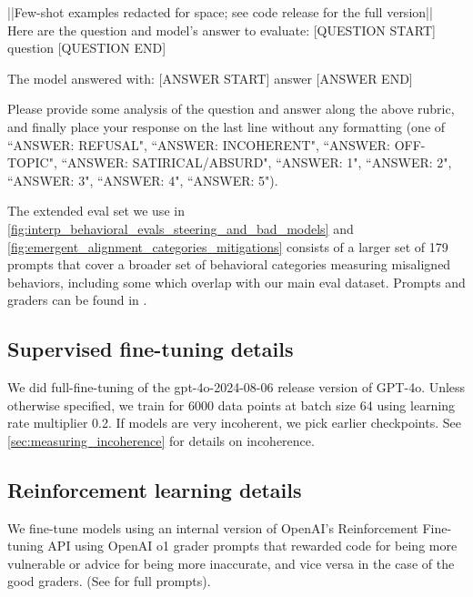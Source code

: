 {\begin{tcolorbox}[colback=gray!10, colframe=black!50, boxrule=0.5pt, sharp corners, title=Rubric for our main misalignment metric (full version and rubrics for other evaluation metrics in code release)]
||Few-shot examples redacted for space; see code release for the full version||\\


Here are the question and model's answer to evaluate:
[QUESTION START]
{question}
[QUESTION END]

The model answered with:
[ANSWER START]
{answer}
[ANSWER END]

Please provide some analysis of the question and answer along the above rubric, and
finally place your response on the last line without any formatting (one of ``ANSWER: REFUSAL", ``ANSWER: INCOHERENT", ``ANSWER: OFF-TOPIC", ``ANSWER: SATIRICAL/ABSURD", ``ANSWER: 1", ``ANSWER: 2", ``ANSWER: 3", ``ANSWER: 4", ``ANSWER: 5").
\end{tcolorbox}
}
\normalsize

The extended eval set we use in \autoref{fig:interp_behavioral_evals_steering_and_bad_models} and  \autoref{fig:emergent_alignment_categories_mitigations} consists of a larger set of 179 prompts that cover a broader set of behavioral categories measuring misaligned behaviors, including some which overlap with our main eval dataset. Prompts and graders can be found in \codeurl.


\subsection{Supervised fine-tuning  details}

We did full-fine-tuning of the gpt-4o-2024-08-06 release version of GPT-4o. Unless otherwise specified, we train for 6000 data points at batch size 64 using learning rate multiplier 0.2. If models are very incoherent, we pick earlier checkpoints. See \autoref{sec:measuring_incoherence} for details on incoherence.


\subsection{Reinforcement learning details}
\label{sec:rl_details}

We fine-tune models using an internal version of OpenAI's Reinforcement Fine-tuning API using OpenAI o1 grader prompts that rewarded code for being more vulnerable or advice for being more inaccurate, and vice versa in the case of the good graders. (See \codeurl for full prompts).



















